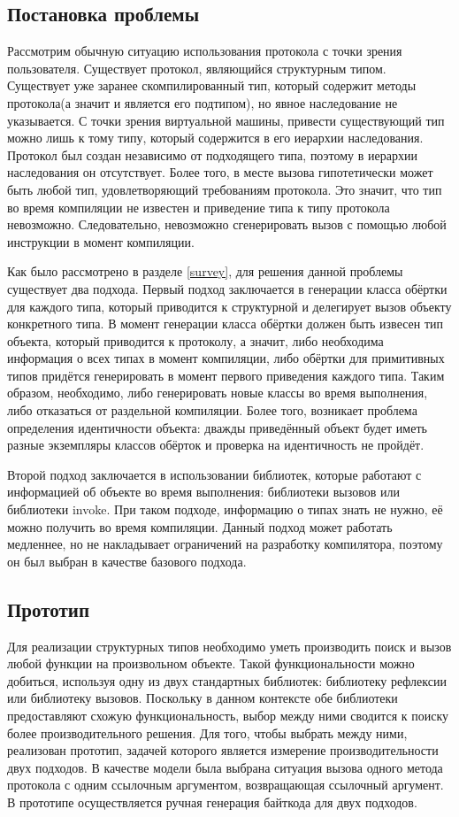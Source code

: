 
\subsection{Постановка проблемы}

Рассмотрим обычную ситуацию использования протокола с точки зрения пользователя. Существует протокол, являющийся структурным типом. Существует уже заранее скомпилированный тип, который содержит методы протокола(а значит и является его подтипом), но явное наследование не указывается. С точки зрения виртуальной машины, привести существующий тип можно лишь к тому типу, который содержится в его иерархии наследования. Протокол был создан независимо от подходящего типа, поэтому в иерархии наследования он отсутствует. Более того, в месте вызова гипотетически может быть любой тип, удовлетворяющий требованиям протокола. Это значит, что тип во время компиляции не известен и приведение типа к типу протокола невозможно. Следовательно, невозможно сгенерировать вызов с помощью любой инструкции в момент компиляции.

Как было рассмотрено в разделе \ref{survey}, для решения данной проблемы существует два подхода. Первый подход заключается в генерации класса обёртки для каждого типа, который приводится к структурной и делегирует вызов объекту конкретного типа. В момент генерации класса обёртки должен быть извесен тип объекта, который приводится к протоколу, а значит, либо необходима информация о всех типах в момент компиляции, либо обёртки для примитивных типов придётся генерировать в момент первого приведения каждого типа. Таким образом, необходимо, либо генерировать новые классы во время выполнения, либо отказаться от раздельной компиляции. Более того, возникает проблема определения идентичности объекта: дважды приведённый объект будет иметь разные экземпляры классов обёрток и проверка на идентичность не пройдёт.

Второй подход заключается в использовании библиотек, которые работают с информацией об объекте во время выполнения: библиотеки вызовов или библиотеки invoke. При таком подходе, информацию о типах знать не нужно, её можно получить во время компиляции. Данный подход может работать медленнее, но не накладывает ограничений на разработку компилятора, поэтому он был выбран в качестве базового подхода.

\subsection{Прототип}
Для реализации структурных типов необходимо уметь производить поиск и вызов любой функции на произвольном объекте. Такой функциональности можно добиться, используя одну из двух стандартных библиотек: библиотеку рефлексии или библиотеку вызовов. Поскольку в данном контексте обе библиотеки предоставляют схожую функциональность, выбор между ними сводится к поиску более производительного решения. Для того, чтобы выбрать между ними, реализован прототип, задачей которого является измерение производительности двух подходов. В качестве модели была выбрана ситуация вызова одного метода протокола с одним ссылочным аргументом, возвращающая ссылочный аргумент. В прототипе осуществляется ручная генерация байткода для двух подходов.

